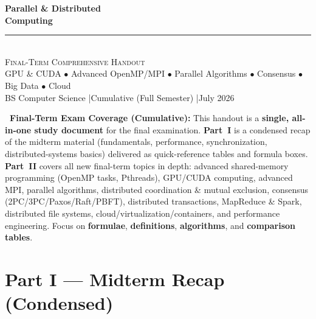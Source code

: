 \documentclass[11pt,a4paper]{article}
\begin{document}
\begin{center}
\vspace*{0.4cm}
{\Huge\bfseries\textcolor{primary}{Parallel \& Distributed}}\\[8pt]
{\Huge\bfseries\textcolor{primary}{Computing}}\\[16pt]
{\color{secondary}\rule{0.65\textwidth}{1.5pt}}\\[14pt]
{\Large\textsc{Final-Term Comprehensive Handout}}\\[8pt]
{\large\textcolor{gray!70!black}{GPU \& CUDA $\bullet$ Advanced OpenMP/MPI $\bullet$ Parallel Algorithms $\bullet$ Consensus $\bullet$ Big Data $\bullet$ Cloud}}\\[6pt]
{\normalsize\textcolor{primary!70}{BS Computer Science \quad|\quad Cumulative (Full Semester) \quad|\quad July 2026}}
\vspace{0.3cm}
\end{center}

\begin{tcolorbox}[
  enhanced, colback=primary!6, colframe=primary,
  boxrule=1pt, arc=4pt, left=10pt, right=10pt, top=6pt, bottom=6pt
]
\textbf{\textcolor{primary}{~Final-Term Exam Coverage (Cumulative):}} This handout is a \textbf{single, all-in-one study document} for the final examination. \textbf{Part~I} is a condensed recap of the midterm material (fundamentals, performance, synchronization, distributed-systems basics) delivered as quick-reference tables and formula boxes. \textbf{Part~II} covers all new final-term topics in depth: advanced shared-memory programming (OpenMP tasks, Pthreads), GPU/CUDA computing, advanced MPI, parallel algorithms, distributed coordination \& mutual exclusion, consensus (2PC/3PC/Paxos/Raft/PBFT), distributed transactions, MapReduce \& Spark, distributed file systems, cloud/virtualization/containers, and performance engineering. Focus on \textbf{formulae}, \textbf{definitions}, \textbf{algorithms}, and \textbf{comparison tables}.
\end{tcolorbox}
\vspace{6pt}
\tableofcontents
\newpage

\part{Part I --- Midterm Recap (Condensed)}
\end{document}
